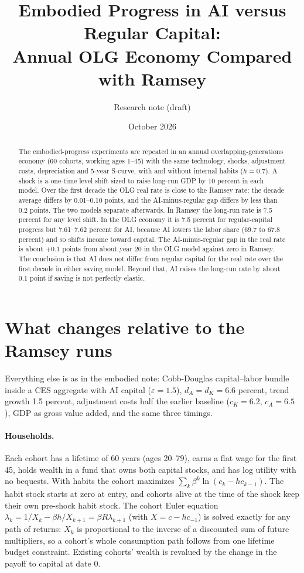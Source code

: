 \documentclass[11pt]{article}
\title{Embodied Progress in AI versus Regular Capital:\\
Annual OLG Economy Compared with Ramsey}
\author{Research note (draft)}
\date{October 2026}
\begin{document}
\maketitle

\begin{abstract}
\noindent The embodied-progress experiments are repeated in an annual overlapping-generations economy (60 cohorts, working ages 1--45) with the same technology, shocks, adjustment costs,
depreciation and 5-year S-curve, with and without internal habits ($h=0.7$). A shock is a one-time level shift sized to raise long-run GDP by 10 percent in each model.
Over the first decade the OLG real rate is close to the Ramsey rate: the decade average differs by 0.01--0.10 points, and the AI-minus-regular gap differs by less than 0.2 points.
The two models separate afterwards. In Ramsey the long-run rate is 7.5 percent for any level shift. In the OLG economy
it is 7.5 percent for regular-capital progress but 7.61--7.62 percent for AI, because AI lowers the labor share (69.7 to 67.8 percent) and so shifts income toward capital. The AI-minus-regular gap in the real rate is
about $+0.1$ points from about year 20 in the OLG model against zero in Ramsey. The conclusion is that AI does not differ from regular capital for the real rate over the first decade in either saving model. Beyond that, AI raises the long-run rate by about 0.1 point if saving is not perfectly elastic.
\end{abstract}

\section{What changes relative to the Ramsey runs}

Everything else is as in the embodied note: Cobb-Douglas capital--labor bundle inside a CES aggregate with AI capital ($\varepsilon=1.5$), $d_A=d_K=6.6$ percent, trend growth 1.5 percent,
adjustment costs half the earlier baseline ($c_K=6.2$, $c_A=6.5$), GDP as gross value added, and the same three timings.

\paragraph{Households.} Each cohort has a lifetime of 60 years (ages 20--79), earns a flat wage for the first 45, holds wealth in a fund that owns both capital stocks, and has log utility with no bequests.
With habits the cohort maximizes $\sum_k\beta^k\ln(c_k-hc_{k-1})$. The habit stock starts at zero at entry, and cohorts alive at the time of the shock keep their own pre-shock habit stock.
The cohort Euler equation $\lambda_k=1/X_k-\beta h/X_{k+1}=\beta R\lambda_{k+1}$ (with $X=c-hc_{-1}$) is solved exactly for any path of returns: $X_k$ is proportional to the inverse of a discounted sum of future multipliers,
so a cohort's whole consumption path follows from one lifetime budget constraint. Existing cohorts' wealth is revalued by the change in the payoff to capital at date 0.
\end{document}
